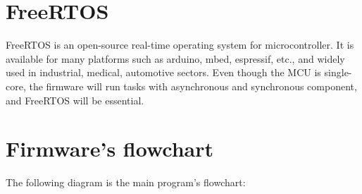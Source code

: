 \documentclass[../main.tex]{subfiles}
\begin{document}
    \section{FreeRTOS}
    
    FreeRTOS is an open-source real-time operating system for microcontroller. It is available for many platforms such as arduino, mbed, espressif, etc., and widely used in industrial, medical, automotive sectors. Even though the MCU is single-core, the firmware will run tasks with asynchronous and synchronous component, and FreeRTOS will be essential.
    
    \pagebreak
    \section{Firmware's flowchart}

    The following diagram is the main program's flowchart:
\end{document}
